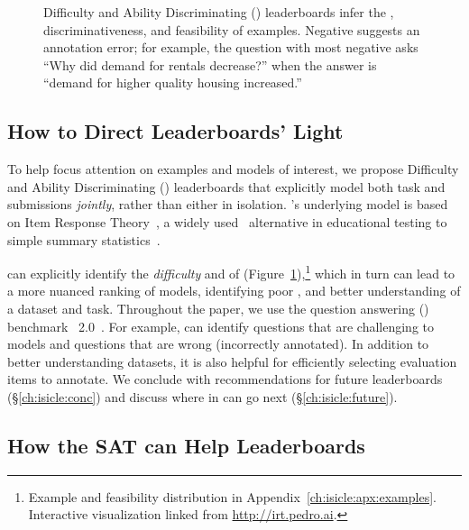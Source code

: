 \begin{figure}[t]
  \centering
  \caption{
    Difficulty and Ability Discriminating (\name{}) leaderboards infer the \diff{}, discriminativeness, and feasibility of examples.
    Negative \discability{} suggests an annotation error; for example, the question with most negative \discability{}
    asks ``Why did demand for rentals decrease?'' when the answer is ``demand for higher quality housing increased.''
  }
  \label{fig:irt-dist}
\end{figure}

\subsection{How to Direct Leaderboards' Light}

To help focus attention on examples and models of interest, we propose
Difficulty and Ability Discriminating (\name{}) leaderboards that
explicitly model both task and submissions \emph{jointly}, rather than
either in isolation.
\name{}'s underlying model is based on Item Response Theory~\citep[,
reviewed in \S\ref{ch:isicle:lead}]{lord1968test,baker2001irt}, a widely
used~\citep{van2016assess} alternative in educational testing to simple
summary statistics~\citep{edgeworth1888exams}.

\name{} can explicitly identify the \emph{difficulty} and
  \emph{\discability{}} of \itms{} (Figure~\ref{fig:irt-dist}),\footnote{
  Example and feasibility distribution in
  Appendix~\ref{ch:isicle:apx:examples}.  Interactive visualization linked
  from \href{https://irt.pedro.ai}{http://irt.pedro.ai}.  } which in turn can
  lead to a more nuanced ranking of models, identifying poor \itms{}, and
  better understanding of a dataset and task.  Throughout the paper, we use
  the question answering (\qa{}) benchmark
  \squad{}~2.0~\citep{rajpurkar-18}.  For example, \name{} can identify
  questions that are challenging to models and questions that are wrong
  (incorrectly annotated).  In addition to better understanding datasets, it
  is also helpful for efficiently selecting evaluation items to annotate.  We
  conclude with recommendations for future leaderboards
  (\S\ref{ch:isicle:conc}) and discuss where \irt{} in \nlp{} can go next
  (\S\ref{ch:isicle:future}).

\subsection{How the SAT can Help Leaderboards}

